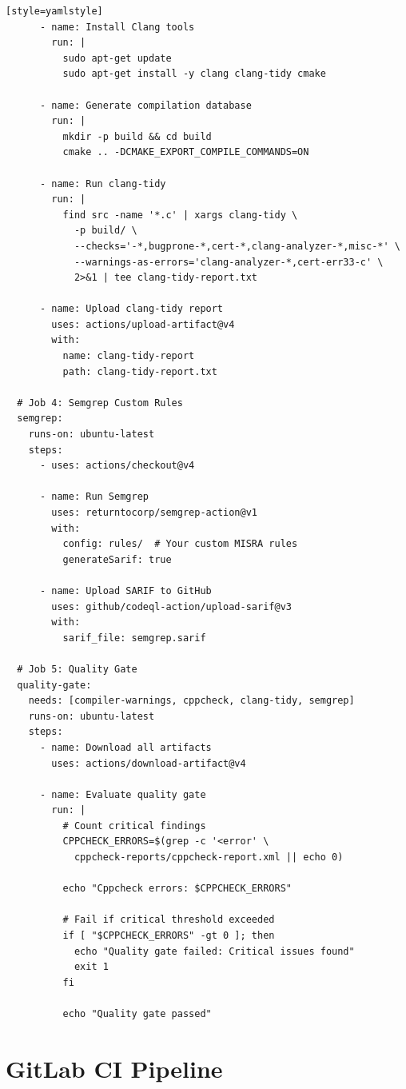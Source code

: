 \documentclass[11pt,letterpaper]{report}
\begin{document}
\begin{verbatim}[style=yamlstyle]
      - name: Install Clang tools
        run: |
          sudo apt-get update
          sudo apt-get install -y clang clang-tidy cmake

      - name: Generate compilation database
        run: |
          mkdir -p build && cd build
          cmake .. -DCMAKE_EXPORT_COMPILE_COMMANDS=ON

      - name: Run clang-tidy
        run: |
          find src -name '*.c' | xargs clang-tidy \
            -p build/ \
            --checks='-*,bugprone-*,cert-*,clang-analyzer-*,misc-*' \
            --warnings-as-errors='clang-analyzer-*,cert-err33-c' \
            2>&1 | tee clang-tidy-report.txt

      - name: Upload clang-tidy report
        uses: actions/upload-artifact@v4
        with:
          name: clang-tidy-report
          path: clang-tidy-report.txt

  # Job 4: Semgrep Custom Rules
  semgrep:
    runs-on: ubuntu-latest
    steps:
      - uses: actions/checkout@v4

      - name: Run Semgrep
        uses: returntocorp/semgrep-action@v1
        with:
          config: rules/  # Your custom MISRA rules
          generateSarif: true

      - name: Upload SARIF to GitHub
        uses: github/codeql-action/upload-sarif@v3
        with:
          sarif_file: semgrep.sarif

  # Job 5: Quality Gate
  quality-gate:
    needs: [compiler-warnings, cppcheck, clang-tidy, semgrep]
    runs-on: ubuntu-latest
    steps:
      - name: Download all artifacts
        uses: actions/download-artifact@v4

      - name: Evaluate quality gate
        run: |
          # Count critical findings
          CPPCHECK_ERRORS=$(grep -c '<error' \
            cppcheck-reports/cppcheck-report.xml || echo 0)

          echo "Cppcheck errors: $CPPCHECK_ERRORS"

          # Fail if critical threshold exceeded
          if [ "$CPPCHECK_ERRORS" -gt 0 ]; then
            echo "Quality gate failed: Critical issues found"
            exit 1
          fi

          echo "Quality gate passed"
\end{verbatim}

\section{GitLab CI Pipeline}
\end{document}
